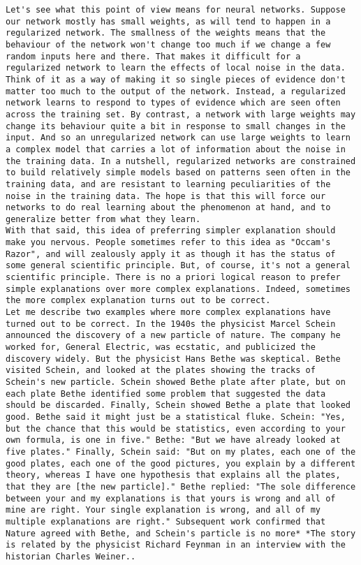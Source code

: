 \begin{lstlisting}
Let's see what this point of view means for neural networks. Suppose our network mostly has small weights, as will tend to happen in a regularized network. The smallness of the weights means that the behaviour of the network won't change too much if we change a few random inputs here and there. That makes it difficult for a regularized network to learn the effects of local noise in the data. Think of it as a way of making it so single pieces of evidence don't matter too much to the output of the network. Instead, a regularized network learns to respond to types of evidence which are seen often across the training set. By contrast, a network with large weights may change its behaviour quite a bit in response to small changes in the input. And so an unregularized network can use large weights to learn a complex model that carries a lot of information about the noise in the training data. In a nutshell, regularized networks are constrained to build relatively simple models based on patterns seen often in the training data, and are resistant to learning peculiarities of the noise in the training data. The hope is that this will force our networks to do real learning about the phenomenon at hand, and to generalize better from what they learn.
With that said, this idea of preferring simpler explanation should make you nervous. People sometimes refer to this idea as "Occam's Razor", and will zealously apply it as though it has the status of some general scientific principle. But, of course, it's not a general scientific principle. There is no a priori logical reason to prefer simple explanations over more complex explanations. Indeed, sometimes the more complex explanation turns out to be correct.
Let me describe two examples where more complex explanations have turned out to be correct. In the 1940s the physicist Marcel Schein announced the discovery of a new particle of nature. The company he worked for, General Electric, was ecstatic, and publicized the discovery widely. But the physicist Hans Bethe was skeptical. Bethe visited Schein, and looked at the plates showing the tracks of Schein's new particle. Schein showed Bethe plate after plate, but on each plate Bethe identified some problem that suggested the data should be discarded. Finally, Schein showed Bethe a plate that looked good. Bethe said it might just be a statistical fluke. Schein: "Yes, but the chance that this would be statistics, even according to your own formula, is one in five." Bethe: "But we have already looked at five plates." Finally, Schein said: "But on my plates, each one of the good plates, each one of the good pictures, you explain by a different theory, whereas I have one hypothesis that explains all the plates, that they are [the new particle]." Bethe replied: "The sole difference between your and my explanations is that yours is wrong and all of mine are right. Your single explanation is wrong, and all of my multiple explanations are right." Subsequent work confirmed that Nature agreed with Bethe, and Schein's particle is no more* *The story is related by the physicist Richard Feynman in an interview with the historian Charles Weiner..

\end{lstlisting}
